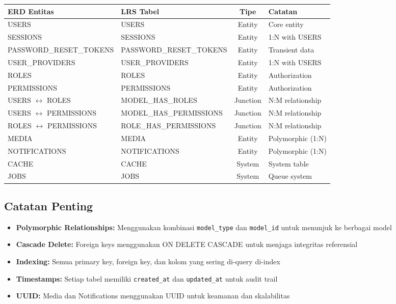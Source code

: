 \documentclass[12pt,a4paper]{article}
\begin{document}
\begin{table}[h]
\centering
\begin{tabularx}{\textwidth}{|l|l|c|X|}
\hline
\textbf{ERD Entitas} & \textbf{LRS Tabel} & \textbf{Tipe} & \textbf{Catatan} \\
\hline
USERS & USERS & Entity & Core entity \\
\hline
SESSIONS & SESSIONS & Entity & 1:N with USERS \\
\hline
PASSWORD\_RESET\_TOKENS & PASSWORD\_RESET\_TOKENS & Entity & Transient data \\
\hline
USER\_PROVIDERS & USER\_PROVIDERS & Entity & 1:N with USERS \\
\hline
ROLES & ROLES & Entity & Authorization \\
\hline
PERMISSIONS & PERMISSIONS & Entity & Authorization \\
\hline
USERS $\leftrightarrow$ ROLES & MODEL\_HAS\_ROLES & Junction & N:M relationship \\
\hline
USERS $\leftrightarrow$ PERMISSIONS & MODEL\_HAS\_PERMISSIONS & Junction & N:M relationship \\
\hline
ROLES $\leftrightarrow$ PERMISSIONS & ROLE\_HAS\_PERMISSIONS & Junction & N:M relationship \\
\hline
MEDIA & MEDIA & Entity & Polymorphic (1:N) \\
\hline
NOTIFICATIONS & NOTIFICATIONS & Entity & Polymorphic (1:N) \\
\hline
CACHE & CACHE & System & System table \\
\hline
JOBS & JOBS & System & Queue system \\
\hline
\end{tabularx}
\end{table}

\subsection{Catatan Penting}

\begin{itemize}
    \item \textbf{Polymorphic Relationships:} Menggunakan kombinasi \texttt{model\_type} dan \texttt{model\_id} untuk menunjuk ke berbagai model
    \item \textbf{Cascade Delete:} Foreign keys menggunakan ON DELETE CASCADE untuk menjaga integritas referensial
    \item \textbf{Indexing:} Semua primary key, foreign key, dan kolom yang sering di-query di-index
    \item \textbf{Timestamps:} Setiap tabel memiliki \texttt{created\_at} dan \texttt{updated\_at} untuk audit trail
    \item \textbf{UUID:} Media dan Notifications menggunakan UUID untuk keamanan dan skalabilitas
\end{itemize}
\end{document}
